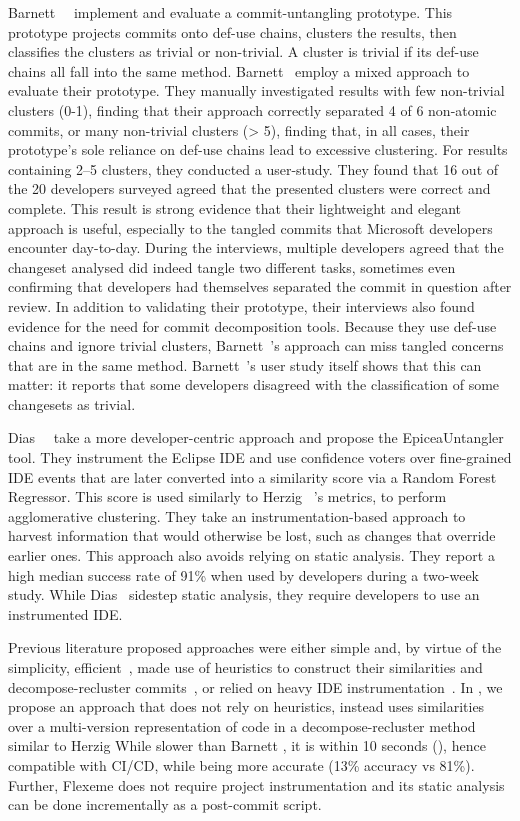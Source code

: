 Barnett~\etal~\cite{Barnett2015} implement and evaluate a commit-untangling
prototype. This prototype projects commits onto def-use chains, clusters the
results, then classifies the clusters as trivial or non-trivial. A cluster is
trivial if its def-use chains all fall into the same method. Barnett~\etal
employ a mixed approach to evaluate their prototype. They manually investigated
results with few non-trivial clusters (0-1), finding that their approach
correctly separated 4 of 6 non-atomic commits,  or many non-trivial clusters (>
5), finding that, in all cases, their prototype's sole reliance on def-use
chains lead to excessive clustering. For results containing 2--5 clusters, they
conducted a user-study. They found that 16 out of the 20 developers surveyed
agreed that the presented clusters were correct and complete. This result is
strong evidence that their lightweight and elegant approach is useful,
especially to the tangled commits that Microsoft developers encounter
day-to-day. During the interviews, multiple developers agreed that the changeset
analysed did indeed tangle two different tasks, sometimes even confirming that
developers had themselves separated the commit in question after review. In
addition to validating their prototype, their interviews also found evidence for
the need for commit decomposition tools. Because they use def-use chains and
ignore trivial clusters, Barnett~\etal's approach can miss tangled concerns that
are in the same method. Barnett~\etal's user study itself shows that this can
matter: it reports that some developers disagreed with the classification of
some changesets as trivial.

Dias~\etal~\cite{Dias2015} take a more developer-centric approach and propose
the EpiceaUntangler tool. They instrument the Eclipse IDE and use confidence
voters over fine-grained IDE events that are later converted into a similarity
score via a Random Forest Regressor. This score is used similarly to Herzig
\etal~\cite{Herzig2016}'s metrics, \ie to perform agglomerative clustering. They
take an instrumentation-based approach to harvest information that would
otherwise be lost, such as changes that override earlier ones. This approach
also avoids relying on static analysis. They report a high median success rate
of 91\% when used by developers during a two-week study. While Dias~\etal
sidestep static analysis, they require developers to use an instrumented IDE.

Previous literature proposed approaches were either simple and, by virtue of the
simplicity, efficient~\cite{Barnett2015}, made use of heuristics to construct
their similarities and decompose-recluster commits~\cite{Herzig2016}, or relied
on heavy IDE instrumentation~\cite{Dias2015}. In , we
propose an approach that does not rely on heuristics, instead uses similarities
over a multi-version representation of code in a decompose-recluster method
similar to Herzig \etal While slower than Barnett \etal, it is within 10
seconds (), hence compatible with CI/CD, while being
more accurate (13\% accuracy vs 81\%). Further, Flexeme does not require project
instrumentation and its static analysis can be done incrementally as a
post-commit script.

